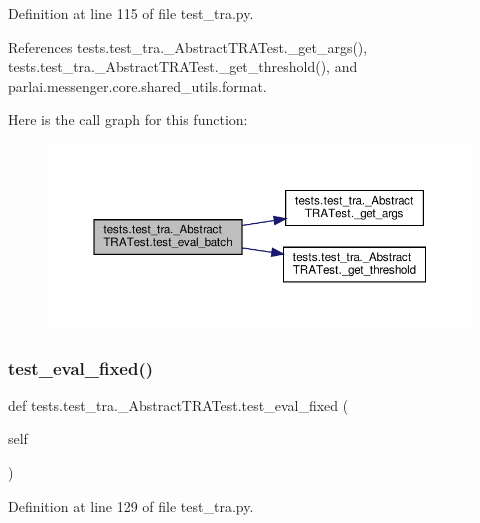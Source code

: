 Definition at line 115 of file test\+\_\+tra.\+py.



References tests.\+test\+\_\+tra.\+\_\+\+Abstract\+T\+R\+A\+Test.\+\_\+get\+\_\+args(), tests.\+test\+\_\+tra.\+\_\+\+Abstract\+T\+R\+A\+Test.\+\_\+get\+\_\+threshold(), and parlai.\+messenger.\+core.\+shared\+\_\+utils.\+format.

Here is the call graph for this function\+:
\nopagebreak
\begin{figure}[H]
\begin{center}
\leavevmode
\includegraphics[width=350pt]{classtests_1_1test__tra_1_1__AbstractTRATest_a4ba4e6e2822503780f927c9916e3ae55_cgraph}
\end{center}
\end{figure}
\mbox{\label{classtests_1_1test__tra_1_1__AbstractTRATest_a34bce944e4e602830f52995c2b42ac81}} 
\subsubsection{\texorpdfstring{test\+\_\+eval\+\_\+fixed()}{test\_eval\_fixed()}}
{\footnotesize\ttfamily def tests.\+test\+\_\+tra.\+\_\+\+Abstract\+T\+R\+A\+Test.\+test\+\_\+eval\+\_\+fixed (\begin{DoxyParamCaption}\item[{}]{self }\end{DoxyParamCaption})}



Definition at line 129 of file test\+\_\+tra.\+py.



